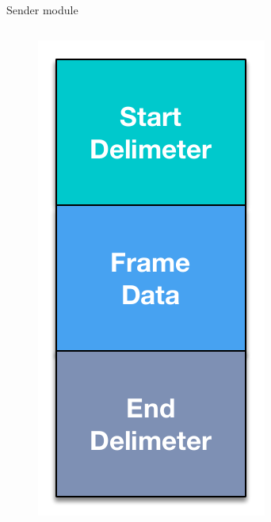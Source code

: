 \documentclass[12pt,beamer]{beamer}
\begin{document}
\begin{frame}{Sender module}
\begin{columns}
	\begin{column}{.25\textwidth}
	\begin{figure}
	\includegraphics[width=\textwidth]{pic/Frame.pdf}

\end{figure}
\end{column}
\end{columns}
\end{frame}
\end{document}
